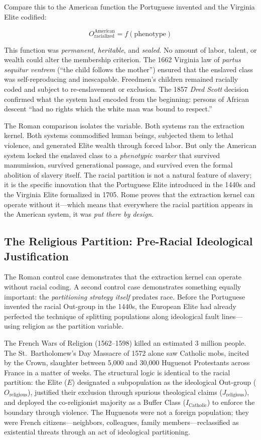 \documentclass[12pt,openany]{book}
\begin{document}
Compare this to the American function the Portuguese invented and the Virginia Elite codified:

\[
O_{\text{racialized}}^{\text{American}} = f(\text{phenotype})
\]

This function was \textit{permanent}, \textit{heritable}, and \textit{sealed}. No amount of labor, talent, or wealth could alter the membership criterion. The 1662 Virginia law of \textit{partus sequitur ventrem} (``the child follows the mother'') ensured that the enslaved class was self-reproducing and inescapable. Freedmen's children remained racially coded and subject to re-enslavement or exclusion. The 1857 \textit{Dred Scott} decision confirmed what the system had encoded from the beginning: persons of African descent ``had no rights which the white man was bound to respect.''

The Roman comparison isolates the variable. Both systems ran the extraction kernel. Both systems commodified human beings, subjected them to lethal violence, and generated Elite wealth through forced labor. But only the American system locked the enslaved class to a \textit{phenotypic marker} that survived manumission, survived generational passage, and survived even the formal abolition of slavery itself. The racial partition is not a natural feature of slavery; it is the specific innovation that the Portuguese Elite introduced in the 1440s and the Virginia Elite formalized in 1705. Rome proves that the extraction kernel can operate without it---which means that everywhere the racial partition appears in the American system, it was \textit{put there by design}.

\subsection{The Religious Partition: Pre-Racial Ideological Justification}

The Roman control case demonstrates that the extraction kernel can operate without racial coding. A second control case demonstrates something equally important: the \textit{partitioning strategy itself} predates race. Before the Portuguese invented the racial Out-group in the 1440s, the European Elite had already perfected the technique of splitting populations along ideological fault lines---using religion as the partition variable.

The French Wars of Religion (1562--1598) killed an estimated 3 million people. The St.\ Bartholomew's Day Massacre of 1572 alone saw Catholic mobs, incited by the Crown, slaughter between 5,000 and 30,000 Huguenot Protestants across France in a matter of weeks. The structural logic is identical to the racial partition: the Elite ($E$) designated a subpopulation as the ideological Out-group ($O_{\text{religious}}$), justified their exclusion through spurious theological claims ($J_{\text{religious}}$), and deployed the co-religionist majority as a Buffer Class ($I_{\text{Catholic}}$) to enforce the boundary through violence. The Huguenots were not a foreign population; they were French citizens---neighbors, colleagues, family members---reclassified as existential threats through an act of ideological partitioning.
\end{document}
